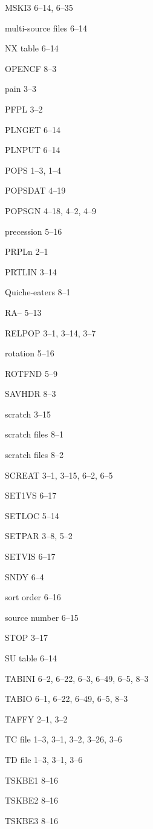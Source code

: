 \item MSKI3 6--14, 6--35
\item multi-source files 6--14
\item NX table 6--14
\item OPENCF 8--3
\item pain 3--3
\item PFPL 3--2
\item PLNGET 6--14
\item PLNPUT 6--14
\item POPS 1--3, 1--4
\item POPSDAT 4--19
\item POPSGN 4--18, 4--2, 4--9
\item precession 5--16
\item PRPLn 2--1
\item PRTLIN 3--14
\item Quiche-eaters 8--1
\item RA-- 5--13
\item RELPOP 3--1, 3--14, 3--7
\item rotation 5--16
\item ROTFND 5--9
\item SAVHDR 8--3
\item scratch 3--15
\item scratch   files 8--1
\item scratch files 8--2
\item SCREAT 3--1, 3--15, 6--2, 6--5
\item SET1VS 6--17
\item SETLOC 5--14
\item SETPAR 3--8, 5--2
\item SETVIS 6--17
\item SNDY 6--4
\item sort order 6--16
\item source number 6--15
\item STOP 3--17
\item SU table 6--14
\item TABINI 6--2, 6--22, 6--3, 6--49, 6--5, 8--3
\item TABIO 6--1, 6--22, 6--49, 6--5, 8--3
\item TAFFY 2--1, 3--2
\item TC file 1--3, 3--1, 3--2, 3--26, 3--6
\item TD file 1--3, 3--1, 3--6
\item TSKBE1 8--16
\item TSKBE2 8--16
\item TSKBE3 8--16
